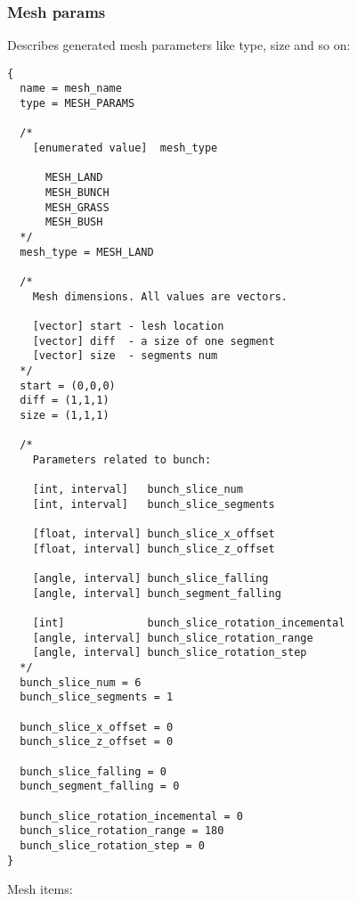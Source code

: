\documentclass[9pt]{article}
\begin{document}
\subsubsection{Mesh params}
Describes generated mesh parameters like type, size and so on:
\begin{verbatim}
{
  name = mesh_name
  type = MESH_PARAMS

  /*
    [enumerated value]  mesh_type
   
      MESH_LAND
      MESH_BUNCH
      MESH_GRASS
      MESH_BUSH
  */
  mesh_type = MESH_LAND
  
  /*
    Mesh dimensions. All values are vectors.
  
    [vector] start - lesh location 
    [vector] diff  - a size of one segment 
    [vector] size  - segments num
  */  
  start = (0,0,0)
  diff = (1,1,1)
  size = (1,1,1)
  
  /*
    Parameters related to bunch:
    
    [int, interval]   bunch_slice_num
    [int, interval]   bunch_slice_segments
      
    [float, interval] bunch_slice_x_offset
    [float, interval] bunch_slice_z_offset
      
    [angle, interval] bunch_slice_falling
    [angle, interval] bunch_segment_falling
        
    [int]             bunch_slice_rotation_incemental
    [angle, interval] bunch_slice_rotation_range
    [angle, interval] bunch_slice_rotation_step
  */    
  bunch_slice_num = 6
  bunch_slice_segments = 1
  
  bunch_slice_x_offset = 0
  bunch_slice_z_offset = 0
  
  bunch_slice_falling = 0
  bunch_segment_falling = 0
  
  bunch_slice_rotation_incemental = 0
  bunch_slice_rotation_range = 180
  bunch_slice_rotation_step = 0
}
\end{verbatim}
Mesh items:
\end{document}
